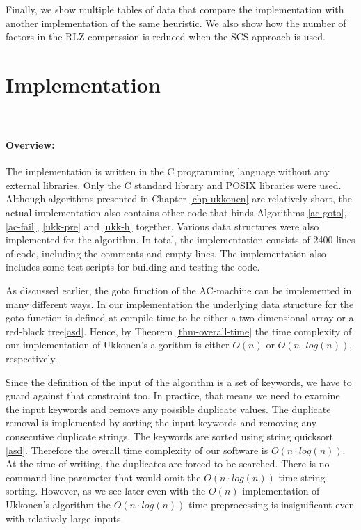 \documentclass[english,twoside,censored,csm,algorithms-track-2020]{HYthesisML}
\theoremstyle{plain}
\theoremstyle{definition}
\begin{document}
Finally, we show multiple tables of data that compare the implementation with
another implementation of the same heuristic. We also show how the number of factors in the
RLZ compression is reduced when the SCS approach is used.

\section{Implementation}~\label{sec-our}

\paragraph{Overview:}
The implementation is written in the C programming language without any external
libraries. Only the C standard library and POSIX libraries were used.
Although algorithms presented in Chapter
\ref{chp-ukkonen} are relatively short, the actual implementation also contains other code
that binds Algorithms \ref{ac-goto}, \ref{ac-fail}, \ref{ukk-pre} and \ref{ukk-h} together. 
Various data structures were also implemented for the algorithm. In total, the implementation consists
of 2400 lines of code, including the comments and empty lines. The implementation also includes some
test scripts for building and testing the code. 

As discussed earlier, the goto function of the AC-machine can be implemented in many different
ways. In our implementation the underlying data structure for the goto function is defined at compile
time to be either a two dimensional array or a red-black tree\ref{asd}. Hence, by Theorem \ref{thm-overall-time}
the time complexity of our implementation of Ukkonen's algorithm is either $O(n)$ or $O(n\cdot log(n))$,
respectively.

Since the definition of the input of the algorithm is a set of keywords, we have to guard against that
constraint too. In practice, that means we need to examine the input keywords and remove any possible
duplicate values. The duplicate removal is implemented by sorting the input keywords and removing any
consecutive duplicate strings. The keywords are sorted using string quicksort \ref{asd}.
Therefore the overall time complexity of our software is $O(n\cdot log(n))$. At the time of writing, the
duplicates are forced to be searched. There is no command line parameter that would omit the 
$O(n\cdot log(n))$ time string sorting. However, as we see later even with the $O(n)$ implementation
of Ukkonen's algorithm the $O(n\cdot log(n))$ time preprocessing is insignificant even with relatively
large inputs.
\end{document}
